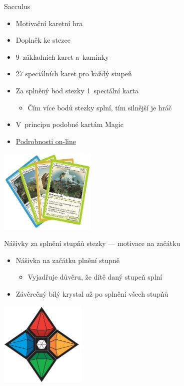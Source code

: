 \documentclass[hyperref={bookmarks=true, unicode=true, colorlinks=true, plainpages=false, pdfkeywords={Skaut, Junak, Skauting, Vychovna metoda}, linkcolor=OrangeRed, anchorcolor=OrangeRed, citecolor=RawSienna, filecolor=RawSienna, menucolor=OrangeRed, urlcolor=RawSienna, pdftex}, compress, xelatex, xcolor=dvipsnames, print]{beamer}
\begin{document}
\begin{frame}{Sacculus}
\begin{multicols}{2}
\begin{itemize}
\item Motivační karetní hra
\item Doplněk ke stezce
\item 9~základních karet a~kamínky
\item 27 speciálních karet pro každý stupeň
\item Za splněný bod stezky 1~speciální karta
\begin{itemize}
 \item Čím více bodů stezky splní, tím silnější je hráč
\end{itemize}
\item V~principu podobné kartám Magic
\item \href{http://krizovatka.skaut.cz/oddil/program/skauti-skautky/skauti-skautky-stezky/skauti-skautky-stezky-sacculus}{Podrobnosti on-line}
\end{itemize}
\columnbreak
\includegraphics[height=4cm]{sacculus.png}
\end{multicols}
\end{frame}

\begin{frame}{Nášivky za splnění stupňů stezky --- motivace na začátku}
\begin{itemize}
\item Nášivka na začátku plnění stupně
 \begin{itemize}
 \item Vyjadřuje důvěru, že dítě daný stupeň splní
 \end{itemize}
\item Závěrečný bílý krystal až po splnění všech stupňů
\end{itemize}
\begin{center}
\includegraphics[height=4cm]{kameny.png}
\end{center}
\end{frame}
\end{document}

